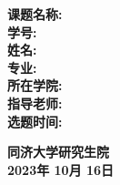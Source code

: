 \newlength{\mylength}
\setlength{\mylength}{15cm} %

\begin{center}
    \begin{spacing}{1.7} %
        \parbox{\mylength}{\centering
            \textbf{\songti\Large %
                课题名称: \underline{} \\
                学\quad \quad 号: \underline{} \\
                姓\quad \quad 名: \underline{} \\
                专\quad \quad 业: \underline{} \\
                所在学院: \underline{} \\
                指导老师: \underline{} \\
                选题时间: \underline{}\\
            }
        }
    \end{spacing}
\end{center}

\vskip 4cm
\begin{center}
    \parbox{5cm}{
        \textbf{\songti\Large 同济大学研究生院  \\
        2023年 10月 16日 }
    }
\end{center}

\thispagestyle{empty}
